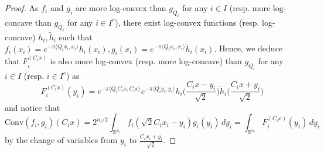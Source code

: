 \documentclass[11pt,a4paper,reqno]{amsart}
\numberwithin{equation}{section}
\theoremstyle{definition}
\renewcommand{\tilde}{\widetilde}
\newcommand{\<}{\ensuremath \leq}
\renewcommand{\>}{\ensuremath \geq}
\renewcommand{\tilde}{\widetilde}
\begin{document}
\begin{proof}
As $f_i$ and $g_i$ are more log-convex than $g_{Q_i}$ for any $i \in I$ (resp. more log-concave than $g_{Q_i}$ for any $i \in I^c$), there exist log-convex functions (resp. log-concave) $h_i, \tilde h_i$ such that $f_i(x_i)=e^{-\pi \langle Q_ix_i,x_i\rangle}h_i(x_i), g_i(x_i)=e^{-\pi \langle Q_ix_i,x_i \rangle}\tilde h_i(x_i).$ Hence, we deduce that $F_i^{(C_ix)}$ is also more log-convex (resp. more log-concave) than $g_{Q_i}$ for any $i \in I$ (resp. $i \in I^c$) as $$F_i^{(C_ix)}(y_i)=e^{-\pi \langle Q_iC_ix,C_ix\rangle}e^{-\pi \langle Q_iy_i,y_i \rangle}h_i \bigl(\frac{C_ix-y_i}{\sqrt{2}} \bigl)\tilde h_i \bigl(\frac{C_ix+y_i}{\sqrt{2}} \bigl)$$ and notice that $$\mathrm{Conv}(f_i,g_i)(C_ix)=2^{n_i/2}\int_{\mathbb{R}^{n_i}} f_i(\sqrt{2}C_ix_i-y_i)g_i(y_i)\, dy_i= \int_{\mathbb{R}^{n_i}}F_i^{(C_ix)}(y_i)\, dy_i$$ by the change of variables from $y_i$ to $\frac{C_ix_i+y_i}{\sqrt{2}}.$  


\end{proof}
\end{document}
